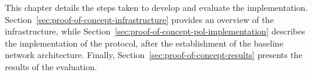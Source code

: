 This chapter details the steps taken to develop and evaluate the \poc{} implementation. Section~\ref{sec:proof-of-concept-infrastructure} provides an overview of the infrastructure, while Section~\ref{sec:proof-of-concept-pol-implementation} describes the implementation of the \pol{} protocol, after the establishment of the baseline network architecture. Finally, Section~\ref{sec:proof-of-concept-results} presents the results of the \poc{} evaluation.